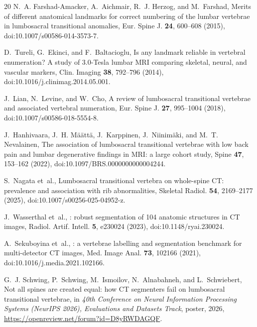 \documentclass[aapm,mph,amsmath,amssymb,reprint]{revtex4-2}
\newif\ifreview \reviewfalse
\begin{document}
\begin{thebibliography}{20}
N.~A. Farshad-Amacker, A.~Aichmair, R.~J. Herzog, and M.~Farshad,
\newblock Merits of different anatomical landmarks for correct numbering of the lumbar vertebrae in lumbosacral transitional anomalies,
\newblock Eur. Spine J. {\bf 24}, 600--608 (2015),
\newblock doi:10.1007/s00586-014-3573-7.

D.~Tureli, G.~Ekinci, and F.~Baltacioglu,
\newblock Is any landmark reliable in vertebral enumeration? {A} study of 3.0-{Tesla} lumbar {MRI} comparing skeletal, neural, and vascular markers,
\newblock Clin. Imaging {\bf 38}, 792--796 (2014),
\newblock doi:10.1016/j.clinimag.2014.05.001.

J.~Lian, N.~Levine, and W.~Cho,
\newblock A review of lumbosacral transitional vertebrae and associated vertebral numeration,
\newblock Eur. Spine J. {\bf 27}, 995--1004 (2018),
\newblock doi:10.1007/s00586-018-5554-8.

J.~Hanhivaara, J.~H. M{\"a}{\"a}tt{\"a}, J.~Karppinen, J.~Niinim{\"a}ki, and M.~T. Nevalainen,
\newblock The association of lumbosacral transitional vertebrae with low back pain and lumbar degenerative findings in {MRI}: a large cohort study,
\newblock Spine {\bf 47}, 153--162 (2022),
\newblock doi:10.1097/BRS.0000000000004244.

S.~Nagata et~al.,
\newblock Lumbosacral transitional vertebra on whole-spine {CT}: prevalence and association with rib abnormalities,
\newblock Skeletal Radiol. {\bf 54}, 2169--2177 (2025),
\newblock doi:10.1007/s00256-025-04952-z.

J.~Wasserthal et~al.,
: robust segmentation of 104 anatomic structures in {CT} images,
\newblock Radiol. Artif. Intell. {\bf 5}, e230024 (2023),
\newblock doi:10.1148/ryai.230024.

A.~Sekuboyina et~al.,
: a vertebrae labelling and segmentation benchmark for multi-detector {CT} images,
\newblock Med. Image Anal. {\bf 73}, 102166 (2021),
\newblock doi:10.1016/j.media.2021.102166.

\ifreview
[Reference removed for double-anonymized review.]
\else
G.~J. Schwing, P.~Schwing, M.~Ismoilov, N.~Alnabahneh, and L.~Schwiebert,
\newblock Not all spines are created equal: how {CT} segmenters fail on lumbosacral transitional vertebrae,
\newblock in {\em 40th Conference on Neural Information Processing Systems (NeurIPS 2026), Evaluations and Datasets Track}, poster, 2026,
\newblock \url{https://openreview.net/forum?id=D8yRWDAGQF}.
\fi


\end{thebibliography}
\end{document}
